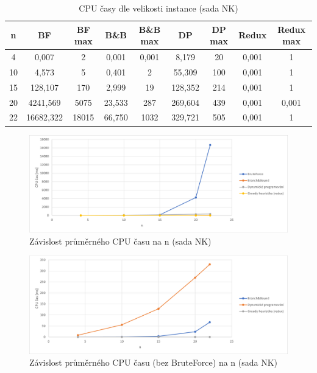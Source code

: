 \documentclass[12pt]{article}
\begin{document}
\begin{table}
    \begin{center} 
         \begin{tabular}{|c | c | c | c| c | c | c | c | c|} 
         \hline
         n & BF & BF max & B\&B & B\&B max & DP & DP max & Redux & Redux max \\ [0.1ex] 
         \hline\hline
        4 & 0,007 & 2 & 0,001 & 0,001 & 8,179 & 20 & 0,001 & 1 \\
        \hline
        10 & 4,573 & 5 & 0,401 & 2 & 55,309 & 100 & 0,001 & 1 \\
        \hline
        15 & 128,107 & 170 & 2,999 & 19 & 128,352 & 214 & 0,001 & 1 \\
        \hline
        20 & 4241,569 & 5075 & 23,533 & 287 & 269,604 & 439 & 0,001 & 0,001 \\
        \hline
        22 & 16682,322 & 18015 & 66,750 & 1032 & 329,721 & 505 & 0,001 & 1 \\
        \hline
        \end{tabular}
        \caption{CPU časy dle velikosti instance (sada NK)}
        \label{tab:nk_cpu_times}
    \end{center}
\end{table}

\begin{figure}[ht]\centering
    \includegraphics[width=1\textwidth, keepaspectratio]{graphs/NK/times/nk_cpu_time_avg.png}
    \caption{Závislost průměrného CPU času na n (sada NK)}
    \label{fig:nk_cpu_time_avg}
\end{figure}

\begin{figure}[ht]\centering
    \includegraphics[width=1\textwidth, keepaspectratio]{graphs/NK/times/nk_cpu_time_avg_without_brute_force.png}
    \caption{Závislost průměrného CPU času (bez BruteForce) na n (sada NK)}
    \label{fig:nk_cpu_time_avg_without_brute_force}
\end{figure}
\end{document}
